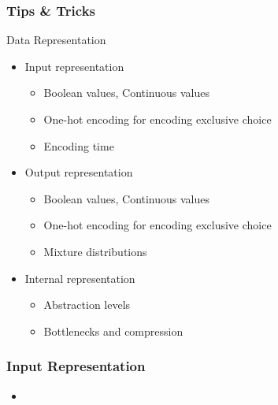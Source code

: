 \documentclass[8pt]{beamer}
\begin{document}
\begin{frame}
\frametitle{Tips \& Tricks}
 \begin{block}{Data Representation}
  \begin{itemize}
   \item Input representation
   \begin{itemize}
    \item Boolean values, Continuous values
    \item One-hot encoding for encoding exclusive choice
    \item Encoding time
   \end{itemize}
   \item Output representation
   \begin{itemize}
    \item Boolean values, Continuous values
    \item One-hot encoding for encoding exclusive choice
    \item Mixture distributions
   \end{itemize}
   \item Internal representation
   \begin{itemize}
    \item Abstraction levels
    \item Bottlenecks and compression
   \end{itemize}
  \end{itemize}
 \end{block}
\end{frame}

\begin{frame}
\frametitle{Input Representation}
 \begin{itemize}
  \item 
 \end{itemize}
\end{frame}
\end{document}
